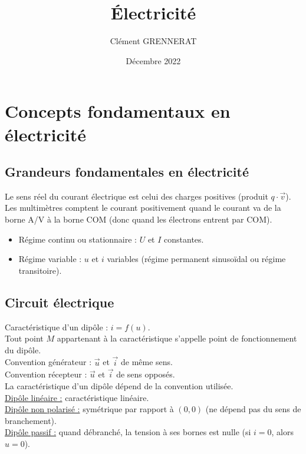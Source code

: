 \documentclass[13pt, twoside, a4paper, french]{report}
\newcommand*{\getSubject}{Électricité}
\begin{document}
\title{\getSubject}
\author{Clément GRENNERAT}
\date{Décembre 2022}
\pagestyle{non-chapter-style}


\chapter{Concepts fondamentaux en électricité}\label{ch:concepts-fondamentaux-en-electricite}
  
  
  \section{Grandeurs fondamentales en électricité}\label{sec:grandeurs-fondamentales-en-electricite}
    
    Le sens réel du courant électrique est celui des charges positives (produit $q \cdot \vec v$).\\
    
    Les multimètres comptent le courant positivement quand le courant va de la borne A/V à la borne COM (donc quand les électrons entrent par COM).\\
    
    \begin{itemize}
      \item Régime continu ou stationnaire : $U$ et $I$ constantes.
      \item Régime variable : $u$ et $i$ variables (régime permanent sinusoïdal ou régime transitoire).
    \end{itemize}
  
  
  \section{Circuit électrique}\label{sec:circuit-electrique}
    
    Caractéristique d'un dipôle : $i = f(u)$.\\
    Tout point $M$ appartenant à la caractéristique s'appelle point de fonctionnement du dipôle.\\
    
    Convention générateur : $\vec u$ et $\vec i$ de même sens.\\
    Convention récepteur : $\vec u$ et $\vec i$ de sens opposés.\\
    La caractéristique d'un dipôle dépend de la convention utilisée.\\
    
    \underline{Dipôle linéaire :} caractéristique linéaire.\\
    \underline{Dipôle non polarisé :} symétrique par rapport à $(0, 0)$ (ne dépend pas du sens de branchement).\\
    \underline{Dipôle passif :} quand débranché, la tension à ses bornes est nulle (si $i = 0$, alors $u = 0$).\\
  
\end{document}

